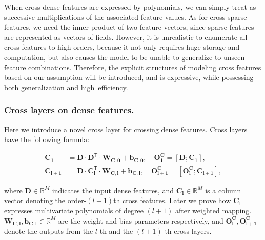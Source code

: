 \documentclass[letterpaper]{article} \usepackage{aaai21}  \usepackage{times}  \usepackage{helvet} \usepackage{courier}  \usepackage[hyphens]{url}  \usepackage{graphicx} \urlstyle{rm} \def\UrlFont{\rm}  \usepackage{natbib}  \usepackage{caption} \frenchspacing  \setlength{\pdfpagewidth}{8.5in}  \setlength{\pdfpageheight}{11in}  \usepackage{graphicx}
\begin{document}
When cross dense features are expressed by polynomials, we can simply treat as successive multiplications of the associated feature values. As for cross sparse features, we need the inner product of two feature vectors, since sparse features are represented as vectors of fields.
However, it is unrealistic to enumerate all cross features to high orders, because it not only requires huge storage and computation, but also causes the model to be unable to generalize to unseen feature combinations. 
Therefore, the explicit structures of modeling cross features based on our assumption will be introduced, and is expressive, while possessing both generalization and high~efficiency.

\subsubsection{Cross layers on dense features.}
Here we introduce a novel cross layer for crossing dense features. Cross layers have the following formula: 
\begin{small}
\begin{equation}
\begin{aligned}
	\bm{C_1} &= \bm{D} \cdot \bm{D^\mathsf{T}} \cdot \bm{W_{C,0}} + \bm{b_{C,0}}, \quad
	\bm{O^{C}_{1}} = [\bm{D}; \bm{C_1}], \\
	\bm{C_{l+1}} &= \bm{D} \cdot \bm{C_{l}^\mathsf{T}} \cdot \bm{W_{C,l}} + \bm{b_{C,l}}, \quad
	\bm{O^{C}_{l+1}} = [\bm{O^{C}_{l}}; \bm{C_{l+1}}],
\end{aligned}
\end{equation}
 \end{small}where $\bm{D} \in \mathbb{R}^M$ indicates the input dense features, and $\bm{C_l} \in \mathbb{R}^M$ is a column vector denoting the order-$(l+1)$th cross features. Later we prove how $\bm{C_l}$ expresses multivariate polynomials of degree $(l+1)$ after weighted mapping. $\bm{W_{C,l}}, \bm{b_{C,l}} \in \mathbb{R}^M$ are the weight and bias parameters respectively, and $\bm{O^{C}_{l}}, \bm{O^{C}_{l+1}}$ denote the outputs from the $l$-th and the $(l+1)$-th cross layers.
\end{document}
